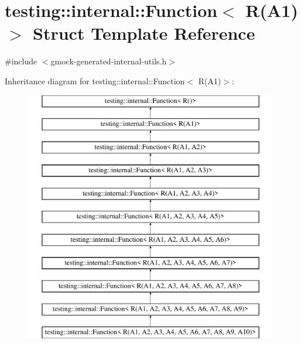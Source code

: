 \hypertarget{structtesting_1_1internal_1_1Function_3_01R_07A1_08_4}{}\section{testing\+::internal\+::Function$<$ R(A1)$>$ Struct Template Reference}
\label{structtesting_1_1internal_1_1Function_3_01R_07A1_08_4}


{\ttfamily \#include $<$gmock-\/generated-\/internal-\/utils.\+h$>$}

Inheritance diagram for testing\+::internal\+::Function$<$ R(A1)$>$\+:\begin{figure}[H]
\begin{center}
\leavevmode
\includegraphics[height=11.000000cm]{structtesting_1_1internal_1_1Function_3_01R_07A1_08_4}
\end{center}
\end{figure}
